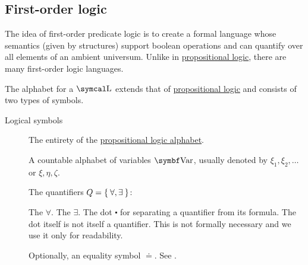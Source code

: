 \subsection{First-order logic}\label{subsec:first_order_logic}

\begin{definition}\label{def:first_order_logic_alphabet}
  The idea of first-order predicate logic is to create a formal language whose semantics (given by structures) support boolean operations and can quantify over all elements of an ambient universum. Unlike in \hyperref[subsec:propositional_logic]{propositional logic}, there are many first-order logic languages.

  The alphabet for a  \( \CL \) extends that of \hyperref[subsec:propositional_logic]{propositional logic} and consists of two types of symbols.

  \begin{description}
    \item[Logical symbols]\mbox{}
    \begin{DefEnum}[series=def:first_order_logic_alphabet]
       The entirety of the \hyperref[subsec:propositional_logic]{propositional logic alphabet}.

       A countable alphabet of variables \( \Bold{Var} \), usually denoted by \( \xi_1, \xi_2, \ldots \) or \( \xi, \eta, \zeta \).

       The quantifiers \( Q = \Set{ \forall, \exists } \):
      \begin{DefEnum}
         The  \( \forall \).
         The  \( \exists \).
         The dot \( \centerdot \) for separating a quantifier from its formula. The dot itself is not itself a quantifier. This is not formally necessary and we use it only for readability.
      \end{DefEnum}

       Optionally, an equality symbol \( \doteq \). See .
    \end{DefEnum}


\end{description}
\end{definition}
